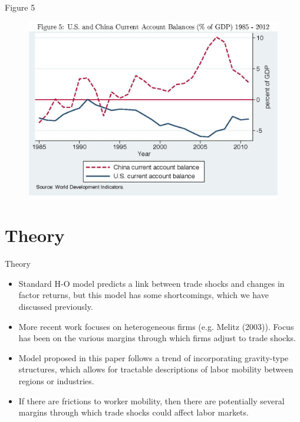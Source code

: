\documentclass[aspectratio=169]{beamer}
\begin{document}

\begin{frame}{Figure 5}

\begin{figure}
    \centering
    \includegraphics[scale=0.65]{AutorDornHansonFig5.jpg}
    \label{fig:fig5}
\end{figure}
    
\end{frame}


\section{Theory}


\begin{frame}{Theory}

\begin{itemize}
    \item<1-> Standard H-O model predicts a link between trade shocks and changes in factor returns, but this model has some shortcomings, which we have discussed previously.
    \item<2-> More recent work focuses on heterogeneous firms (e.g. Melitz (2003)).  Focus has been on the various margins through which firms adjust to trade shocks.
    \item<3-> Model proposed in this paper follows a trend of incorporating gravity-type structures, which allows for tractable descriptions of labor mobility between regions or industries.
    \item<4-> If there are frictions to worker mobility, then there are potentially several margins through which trade shocks could affect labor markets.
\end{itemize}
    
\end{frame}
\end{document}
